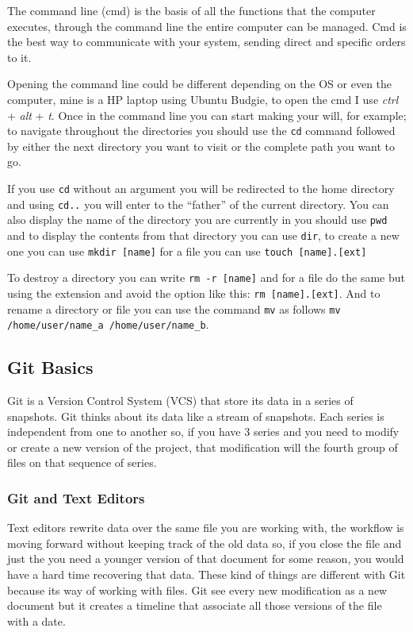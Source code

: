 \documentclass{article}
\begin{document}
    The command line (cmd) is the basis of all the functions that the computer executes, through the command line the entire computer can be managed. Cmd is the best way to communicate with your system, sending direct and specific orders to it.\par
    Opening the command line could be different depending on the OS or even the computer, mine is a HP laptop using Ubuntu Budgie, to open the cmd I use \textit{ctrl} + \textit{alt} + \textit{t}. Once in the command line you can start making your will, for example; to navigate throughout the directories you should use the {\tt cd} command followed by either the next directory you want to visit or the complete path you want to go.\par
    If you use {\tt cd} without an argument you will be redirected to the home directory and using {\tt cd..} you will enter to the ``father'' of the current directory. You can also display the name of the directory you are currently in you should use  {\tt pwd} and to display the contents from that directory you can use {\tt dir}, to create a new one you can use {\tt mkdir [name]} for a file you can use {\tt touch [name].[ext]}\par
    To destroy a directory you can write {\tt rm -r [name]} and for a file do the same but using the extension and avoid the option like this: {\tt rm [name].[ext]}. And to rename a directory or file you can use the command {\tt mv} as follows {\tt mv /home/user/name\_a /home/user/name\_b}.
    
    \subsection{Git Basics}
    
    Git is a Version Control System (VCS) that store its data in a series of snapshots. Git thinks about its data like a stream of snapshots. Each series is independent from one to another so, if you have 3 series and you need to modify or create a new version of the project, that modification will the fourth group of files on that sequence of series. \par
    
    \subsubsection{Git and Text Editors}
	
	
	Text editors rewrite data over the same file you are working with, the workflow is moving forward without keeping track of the old data so, if you close the file and just the you need a younger version of that document for some reason, you would have a hard time recovering that data. These kind of things are different with Git because its way of working with files. Git see every new modification as a new document but it creates a timeline that associate all those versions of the file with a date.\par
	
\end{document}
